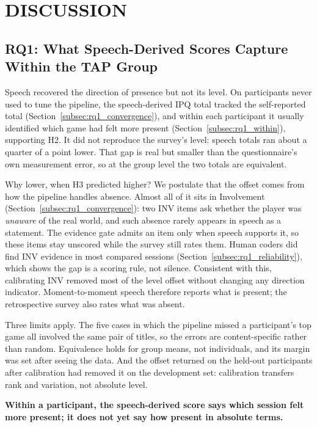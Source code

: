 \section{DISCUSSION}
\label{sec:discussion}

\subsection{RQ1: What Speech-Derived Scores Capture Within the TAP Group}

Speech recovered the direction of presence but not its level. On participants never used to tune the pipeline, the speech-derived IPQ total tracked the self-reported total (Section~\ref{subsec:rq1_convergence}), and within each participant it usually identified which game had felt more present (Section~\ref{subsec:rq1_within}), supporting H2. It did not reproduce the survey's level: speech totals ran about a quarter of a point lower. That gap is real but smaller than the questionnaire's own measurement error, so at the group level the two totals are equivalent.

Why lower, when H3 predicted higher? We postulate that the offset comes from how the pipeline handles absence. Almost all of it sits in Involvement (Section~\ref{subsec:rq1_convergence}): two INV items ask whether the player was \emph{unaware} of the real world, and such absence rarely appears in speech as a statement. The evidence gate admits an item only when speech supports it, so these items stay unscored while the survey still rates them. Human coders did find INV evidence in most compared sessions (Section~\ref{subsec:rq1_reliability}), which shows the gap is a scoring rule, not silence. Consistent with this, calibrating INV removed most of the level offset without changing any direction indicator. Moment-to-moment speech therefore reports what is present; the retrospective survey also rates what was absent.

Three limits apply. The five cases in which the pipeline missed a participant's top game all involved the same pair of titles, so the errors are content-specific rather than random. Equivalence holds for group means, not individuals, and its margin was set after seeing the data. And the offset returned on the held-out participants after calibration had removed it on the development set: calibration transfers rank and variation, not absolute level.

\textbf{Within a participant, the speech-derived score says which session felt more present; it does not yet say how present in absolute terms.}

